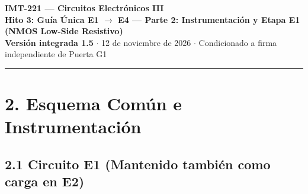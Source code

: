 \documentclass[10pt, a4paper, landscape]{article}
\begin{document}
\noindent
{\LARGE \textbf{\textcolor{ucbblue}{IMT-221 — Circuitos Electrónicos III}}}\\[0.12cm]
{\Large \textbf{Hito 3: Guía Única E1 $\rightarrow$ E4 — Parte 2: Instrumentación y Etapa E1 (NMOS Low-Side Resistivo)}}\\[0.08cm]
{\small \textbf{Versión integrada 1.5} $\cdot$ 12 de noviembre de 2026 $\cdot$ Condicionado a firma independiente de Puerta G1}
\par\vspace{0.15cm}\noindent\rule{\linewidth}{0.4pt}\vspace{0.2cm}

\section*{2. Esquema Común e Instrumentación}

\subsection*{2.1 Circuito E1 (Mantenido también como carga en E2)}
\end{document}
